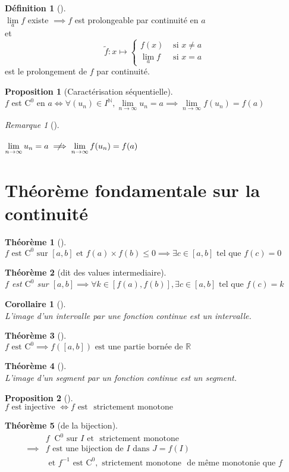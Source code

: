 \documentclass{article}
\newcommand{\R}{\mathbb{R}}
\newcommand{\N}{\mathbb{N}}
\newcommand{\et}{\text{ et }}
\newcommand{\tq}{\text{ tel que }}
\newcommand{\lm}{\lim\limits}
\newcommand{\co}[1]{\mathrm{C^{#1}}}
\newcommand{\lminf}{\lm_{n \to \infty}}
\newcommand{\notimplies}{\centernot\implies}
\newcommand{\est}{\text{ est }}
\newcommand{\strmo}{\text{ strictement monotone }}
\newcommand{\sur}{\text{ sur }}
\newenvironment{att}
{\bgroup \color{red}{\Large\textbf{Attention}}\\}
{\egroup}
\theoremstyle{definition}
\newtheorem*{prop}{Proposition}
\newtheorem*{defin}{Définition}
\theoremstyle{remark}
\newtheorem*{rema}{Remarque}
\theoremstyle{plain}
\newtheorem*{them}{Théorème}
\newtheorem*{coro}{Corollaire}
\newenvironment{prp}[1][]
{\begin{prop}[#1]\quad\\}
{\end{prop}}
\newenvironment{dfn}[1][]
{\begin{defin}[#1]\quad\\}
{\end{defin}}
\newenvironment{rem}[1][]
{\begin{rema}[#1]\quad\\}
{\end{rema}}
\newenvironment{thm}[1][]
{\begin{them}[#1]\quad\\}
{\end{them}}
\newenvironment{cor}[1][]
{\begin{coro}[#1]\quad\\}
{\end{coro}}
\begin{document}
\begin{dfn}
$\lm_a f$ existe $\implies f$ est prolongeable par continuité en $a$ \\
et 
\[
\tilde{f} : x \mapsto
\begin{cases}
f(x)    &\text{ si } x \neq a \\
\lm_a f &\text{ si } x = a
\end{cases}
\]
est le prolongement de $f$ par continuité.
\end{dfn}

\begin{prp}[Caractérisation séquentielle]
$f$ est $\co{0}$ en $a \iff \forall (u_n) \in I^\N,
\lm_{n \to \infty} u_n = a \implies \lm_{n \to \infty} f(u_n) = f(a)$
\end{prp}

\begin{rem}
\begin{att}
$\lminf u_n = a \notimplies \lminf f(u_n) = f(a)$
\end{att}
\end{rem}

\section{Théorème fondamentale sur la continuité}

\begin{thm}
$f \est \co{0} \text{ sur } {[a, b]} \et f(a) \times f(b) \leq 0
\implies \exists c \in {[a, b]} \tq f(c) = 0$
\end{thm}

\begin{thm}[dit des values intermediaire]
$f$ est $\co{0}$ sur ${[a, b]} \implies 
\forall k \in {[f(a), f(b)]}, \exists c \in [a, b] \tq f(c) = k$
\end{thm}

\begin{cor}
L'image d'un intervalle par une fonction continue est un intervalle.
\end{cor}

\begin{thm}
$f \est \co{0} \implies f({[a, b]}) \text{ est une partie bornée de } \R$
\end{thm}

\begin{thm}
L'image d'un segment par un fonction continue est un segment.
\end{thm}

\begin{prp}
$f \text{ est injective } \iff f \est \! \strmo$
\end{prp}

\begin{thm}[de la bijection]
\begin{align*}
            &f \;\; \co{0} \sur I \et \!\! \strmo \\ 
\implies    &f \text{ est une bijection de } I \text{ dans } J = f(I) \\
            &\!\! \et f^{-1} \est \co{0}, \strmo \!\! 
                \text{ de même monotonie que } f
\end{align*}
\end{thm}
\end{document}
